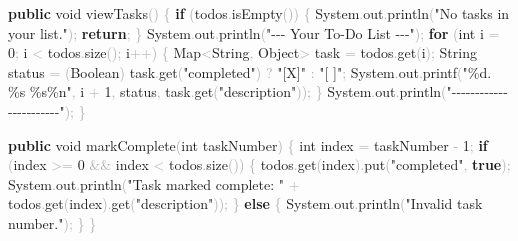 \documentclass[
  justified,
  openright,
]{tufte-book}
\newcommand{\KeywordTok}[1]{\textcolor{CodeKeyword}{\textbf{#1}}}  %
\newcommand{\StringTok}[1]{\textcolor{CodeString}{#1}}              %
\newcommand{\CodeNumTok}[1]{\textcolor{CodeNumber}{#1}}             %
\newcommand{\CodeFuncTok}[1]{\textcolor{CodeKeyword}{#1}}           %
\newcommand{\CodeTypeTok}[1]{\textcolor{CodeType}{#1}}              %
\newcommand{\OperatorTok}[1]{\textcolor{DarkGray}{#1}}              %
\newenvironment{Shaded}{%
  \begin{mdframed}[style=TufteCode]%
}{%
  \end{mdframed}%
}
\begin{document}
\begin{Shaded}
\begin{Highlighting}[]
    \KeywordTok{public} \CodeTypeTok{void} \CodeFuncTok{viewTasks}\OperatorTok{()} \OperatorTok{\{}
        \KeywordTok{if} \OperatorTok{(}todos\OperatorTok{.}\CodeFuncTok{isEmpty}\OperatorTok{())} \OperatorTok{\{}
            System\OperatorTok{.}\CodeFuncTok{out}\OperatorTok{.}\CodeFuncTok{println}\OperatorTok{(}\StringTok{"No tasks in your list."}\OperatorTok{);}
            \KeywordTok{return}\OperatorTok{;}
        \OperatorTok{\}}
        System\OperatorTok{.}\CodeFuncTok{out}\OperatorTok{.}\CodeFuncTok{println}\OperatorTok{(}\StringTok{"{-}{-}{-} Your To{-}Do List {-}{-}{-}"}\OperatorTok{);}
        \KeywordTok{for} \OperatorTok{(}\CodeTypeTok{int} i \OperatorTok{=} \CodeNumTok{0}\OperatorTok{;} i \OperatorTok{\textless{}} todos\OperatorTok{.}\CodeFuncTok{size}\OperatorTok{();} i\OperatorTok{++)} \OperatorTok{\{}
            Map\OperatorTok{\textless{}}String\OperatorTok{,} Object\OperatorTok{\textgreater{}} task \OperatorTok{=} todos\OperatorTok{.}\CodeFuncTok{get}\OperatorTok{(}i\OperatorTok{);}
            String status \OperatorTok{=} \OperatorTok{(}Boolean\OperatorTok{)} task\OperatorTok{.}\CodeFuncTok{get}\OperatorTok{(}\StringTok{"completed"}\OperatorTok{)} \OperatorTok{?} \StringTok{"[X]"} \OperatorTok{:} \StringTok{"[ ]"}\OperatorTok{;}
            System\OperatorTok{.}\CodeFuncTok{out}\OperatorTok{.}\CodeFuncTok{printf}\OperatorTok{(}\StringTok{"}\StringTok{\%d}\StringTok{. }\StringTok{\%s}\StringTok{ }\StringTok{\%s\%n}\StringTok{"}\OperatorTok{,} i \OperatorTok{+} \CodeNumTok{1}\OperatorTok{,} status\OperatorTok{,} task\OperatorTok{.}\CodeFuncTok{get}\OperatorTok{(}\StringTok{"description"}\OperatorTok{));}
        \OperatorTok{\}}
        System\OperatorTok{.}\CodeFuncTok{out}\OperatorTok{.}\CodeFuncTok{println}\OperatorTok{(}\StringTok{"{-}{-}{-}{-}{-}{-}{-}{-}{-}{-}{-}{-}{-}{-}{-}{-}{-}{-}{-}{-}{-}{-}{-}"}\OperatorTok{);}
    \OperatorTok{\}}
 
    \KeywordTok{public} \CodeTypeTok{void} \CodeFuncTok{markComplete}\OperatorTok{(}\CodeTypeTok{int} taskNumber\OperatorTok{)} \OperatorTok{\{}
        \CodeTypeTok{int} index \OperatorTok{=} taskNumber \OperatorTok{{-}} \CodeNumTok{1}\OperatorTok{;}
        \KeywordTok{if} \OperatorTok{(}index \OperatorTok{\textgreater{}=} \CodeNumTok{0} \OperatorTok{\&\&} index \OperatorTok{\textless{}} todos\OperatorTok{.}\CodeFuncTok{size}\OperatorTok{())} \OperatorTok{\{}
            todos\OperatorTok{.}\CodeFuncTok{get}\OperatorTok{(}index\OperatorTok{).}\CodeFuncTok{put}\OperatorTok{(}\StringTok{"completed"}\OperatorTok{,} \KeywordTok{true}\OperatorTok{);}
            System\OperatorTok{.}\CodeFuncTok{out}\OperatorTok{.}\CodeFuncTok{println}\OperatorTok{(}\StringTok{"Task marked complete: "} \OperatorTok{+} todos\OperatorTok{.}\CodeFuncTok{get}\OperatorTok{(}index\OperatorTok{).}\CodeFuncTok{get}\OperatorTok{(}\StringTok{"description"}\OperatorTok{));}
        \OperatorTok{\}} \KeywordTok{else} \OperatorTok{\{}
            System\OperatorTok{.}\CodeFuncTok{out}\OperatorTok{.}\CodeFuncTok{println}\OperatorTok{(}\StringTok{"Invalid task number."}\OperatorTok{);}
        \OperatorTok{\}}
    \OperatorTok{\}}
 

\end{Highlighting}
\end{Shaded}
\end{document}
